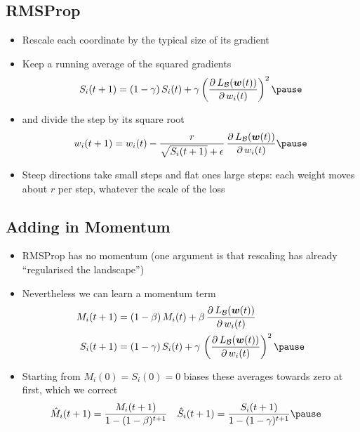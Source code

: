 \begin{slide}
\section[-2]{RMSProp}

\begin{PauseHighLight}
  \begin{itemize}\squeeze
  \item Rescale each coordinate by the typical size of its gradient\pause
  \item Keep a running average of the squared gradients
    \begin{align*}
      S_i(t+1) = (1-\gamma)\, S_i(t) + \gamma \left(
      \pd{L_{\mathcal{B}}(\bm{w}(t))}{w_i(t)} \right)^2\pause
    \end{align*}
  \item and divide the step by its square root
    \begin{align*}
      w_i(t+1) = w_i(t) - \frac{r}{\sqrt{S_i(t+1)}+\epsilon}\,
      \pd{L_{\mathcal{B}}(\bm{w}(t))}{w_i(t)}\pause
    \end{align*}
  \item Steep directions take small steps and flat ones large steps:
    each weight moves about $r$ per step, whatever the scale of the loss\pause
  \end{itemize}
\end{PauseHighLight}
\end{slide}


\begin{slide}
\section[-2]{Adding in Momentum}

\begin{PauseHighLight}
  \begin{itemize}
  \item RMSProp has no momentum (one argument is that rescaling has
    already ``regularised the landscape'')\pause
  \item Nevertheless we can learn a momentum term
    {\small
    \begin{align*}
      M_i(t+1)
      &= (1-\beta)\,M_i(t) + \beta \,
        \pd{L_{\mathcal{B}}(\bm{w}(t))}{w_i(t)}
      \\
      S_i(t+1)
      &= (1-\gamma)\,S_i(t) + \gamma \,
        \left( \pd{L_{\mathcal{B}}(\bm{w}(t))}{w_i(t)} \right)^2\pause
    \end{align*}}
  \item Starting from $M_i(0)=S_i(0)=0$ biases these averages towards zero at first, which we correct
    \begin{align*}
      \hat{M}_i(t+1) &= \frac{M_i(t+1)}{1-(1-\beta)^{t+1}}
      &
        \hat{S}_i(t+1) &= \frac{S_i(t+1)}{1-(1-\gamma)^{t+1}}\pause
    \end{align*}
 \end{itemize}
\end{PauseHighLight}

\end{slide}

